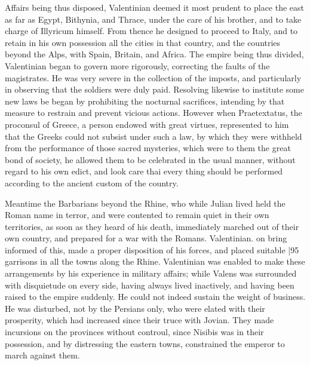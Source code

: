 Affairs being thus disposed, Valentinian deemed it most prudent to place the east as far as Egypt, Bithynia, and Thrace, under the care of his brother, and to take charge of Illyricum himself. From thence he designed to proceed to Italy, and to retain in his own possession all the cities in that country, and the countries beyond the Alps, with Spain, Britain, and Africa. The empire being thus divided, Valentinian began to govern more rigorously, correcting the faults of the magistrates. He was very severe in the collection of the imposts, and particularly in observing that the soldiers were duly paid. Resolving likewise to institute some new laws be began by prohibiting the nocturnal sacrifices, intending by that measure to restrain and prevent vicious actions. However when Praetextatus, the proconsul of Greece, a person endowed with great virtues, represented to him that the Greeks could not subsist under such a law, by which they were withheld from the performance of those sacred mysteries, which were to them the great bond of society, he allowed them to be celebrated in the usual manner, without regard to his own edict, and look care thai every thing should be performed according to the ancient custom of the country.

Meantime the Barbarians beyond the Rhine, who while Julian lived held the Roman name in terror, and were contented to remain quiet in their own territories, as soon as they heard of his death, immediately marched out of their own country, and prepared for a war with the Romans. Valentinian. on bring informed of this, made a proper disposition of his forces, and placed suitable
|95 garrisons in all the towns along the Rhine. Valentinian was enabled to make these arrangements by his experience in military affairs; while Valens was surrounded with disquietude on every side, having always lived inactively, and having been raised to the empire suddenly. He could not indeed sustain the weight of business. He was disturbed, not by the Persians only, who were elated with their prosperity, which had increased since their truce with Jovian. They made incursions on the provinces without controul, since Nisibis was in their possession, and by distressing the eastern towns, constrained the emperor to march against them.

